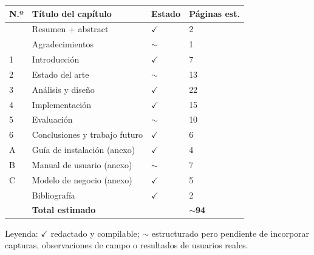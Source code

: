 \documentclass[a4paper, 12pt, twoside, openright]{report}
\providecommand{\cmark}{\ensuremath{\checkmark}}
\providecommand{\pmark}{$\sim$}
\begin{document}
\begin{center}
\small
\begin{tabular}{@{}L{0.7cm}L{8cm}L{1cm}L{2.5cm}@{}}
\toprule
\textbf{N.º} & \textbf{Título del capítulo} & \textbf{Estado} & \textbf{Páginas est.} \\
\midrule
   & Resumen + abstract & \cmark & 2 \\
   & Agradecimientos & \pmark & 1 \\
1  & Introducción & \cmark & 7 \\
2  & Estado del arte & \pmark & 13 \\
3  & Análisis y diseño & \cmark & 22 \\
4  & Implementación & \cmark & 15 \\
5  & Evaluación & \pmark & 10 \\
6  & Conclusiones y trabajo futuro & \cmark & 6 \\
A  & Guía de instalación (anexo) & \cmark & 4 \\
B  & Manual de usuario (anexo) & \pmark & 7 \\
C  & Modelo de negocio (anexo) & \cmark & 5 \\
   & Bibliografía & \cmark & 2 \\
\midrule
   & \textbf{Total estimado} & & \textbf{$\sim$94} \\
\bottomrule
\end{tabular}
\end{center}

\vspace{0.5cm}

\noindent Leyenda: \cmark{} redactado y compilable; \pmark{} estructurado pero pendiente de incorporar capturas, observaciones de campo o resultados de usuarios reales.

\newpage
\setcounter{tocdepth}{2}
\tableofcontents

\clearpage
{}
\setcounter{page}{1}




\end{document}
